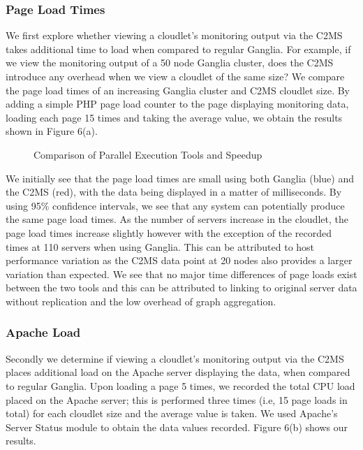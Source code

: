 \documentclass[10pt, conference, compsocconf]{IEEEtran}
\begin{document}
\subsubsection{Page Load Times}
We first explore whether viewing a cloudlet's monitoring output via the C2MS takes additional time to load when compared to regular Ganglia. For example, if we view the monitoring output of a 50 node Ganglia cluster, does the C2MS introduce any overhead when we view a cloudlet of the same size? We compare the page load times of an increasing Ganglia cluster and C2MS cloudlet size. By adding a simple PHP page load counter to the page displaying monitoring data, loading each page 15 times and taking the average value, we obtain the results shown in Figure 6(a). 


\begin{figure*}
\centering
{}
\caption{Comparison of Parallel Execution Tools and Speedup}
\end{figure*}

We initially see that the page load times are small using both Ganglia (blue) and the C2MS (red), with the data being displayed in a matter of milliseconds. By using 95\% confidence intervals, we see that any system can potentially produce the same page load times. As the number of servers increase in the cloudlet, the page load times increase slightly however with the exception of the recorded times at 110 servers when using Ganglia. This can be attributed to host performance variation as the C2MS data point at 20 nodes also provides a larger variation than expected. We see that no major time differences of page loads exist between the two tools and this can be attributed to linking to original server data without replication and the low overhead of graph aggregation.
 
\subsubsection{Apache Load}
Secondly we determine if viewing a cloudlet's monitoring output via the C2MS places additional load on the Apache server displaying the data, when compared to regular Ganglia. Upon loading a page 5 times, we recorded the total CPU load placed on the Apache server; this is performed three times (i.e, 15 page loads in total) for each cloudlet size and the average value is taken. We used Apache's Server Status module to obtain the data values recorded. Figure 6(b) shows our results.
\end{document}

